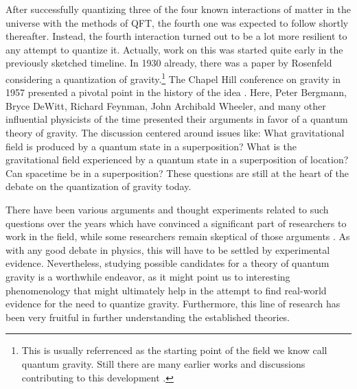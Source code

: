 After successfully quantizing three of the four known interactions of matter in
the universe with the methods of QFT, the fourth one was expected to follow
shortly thereafter. Instead, the fourth interaction turned out to be a lot more
resilient to any attempt to quantize it. Actually, work on this was started
quite early in the previously sketched timeline. In 1930 already, there was a
paper by Rosenfeld \cite{rosenfeldZurQuantelungWellenfelder1930} considering a
quantization of gravity.\footnote{This is usually referrenced as the starting
point of the field we know call quantum gravity. Still there are many earlier
works and discussions contributing to this development
\cite{peruzziTalesPrehistoryQuantum2018}.} The Chapel Hill conference on
gravity in 1957 presented a pivotal point in the history of the idea
\cite{ricklesRoleGravitationPhysics2011}. Here, Peter Bergmann, Bryce DeWitt,
Richard Feynman, John Archibald Wheeler, and many other influential physicists
of the time presented their arguments in favor of a quantum theory of gravity.
The discussion centered around issues like: What gravitational field is
produced by a quantum state in a superposition? What is the gravitational field
experienced by a quantum state in a superposition of location? Can spacetime be
in a superposition? These questions are still at the heart of the debate on the
quantization of gravity today.

There have been various arguments and thought experiments related to such
questions over the years
\cite{peresHybridClassicalquantumDynamics2001,dewittGlobalApproachQuantum2003,marlettoWhyWeNeed2017}
which have convinced a significant part of researchers to work in the field,
while some researchers remain skeptical of those arguments
\cite{oppenheimItTimeRethink2023}. As with any good debate in physics, this
will have to be settled by experimental evidence. Nevertheless, studying
possible candidates for a theory of quantum gravity is a worthwhile endeavor,
as it might point us to interesting phenomenology that might ultimately help in
the attempt to find real-world evidence for the need to quantize gravity.
Furthermore, this line of research has been very fruitful in further
understanding the established theories. 

